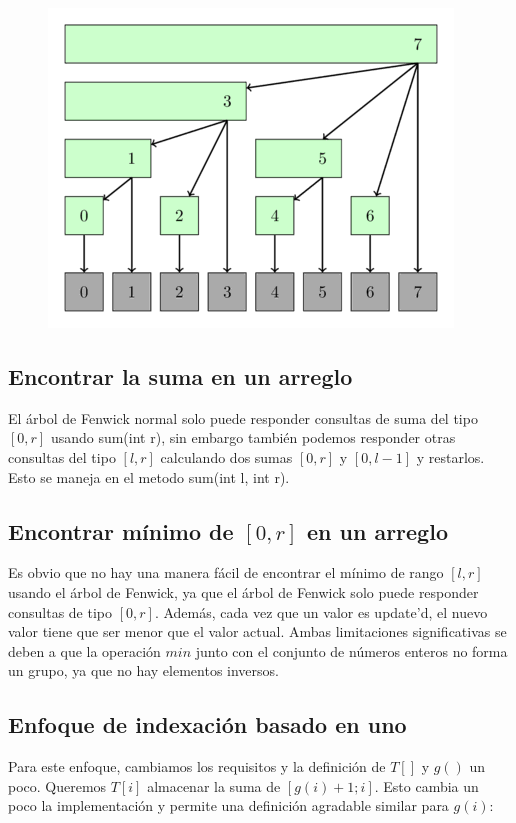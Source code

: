\begin{figure}[h!]
	\centering
	\includegraphics[width=0.5\linewidth]{img/binary_indexed_tree}
	\label{fig:binaryindexedtree}
\end{figure}

\subsection{Encontrar la suma en un arreglo}

El árbol de Fenwick normal solo puede responder consultas de suma del tipo $[0,r]$ usando sum(int 
r), sin embargo también podemos responder otras consultas del tipo $[l,r]$ calculando dos sumas 
$[0,r]$ y $[0,l-1]$ y restarlos. Esto se maneja en el metodo sum(int l, int r).

\subsection{Encontrar mínimo de $[0,r]$ en un arreglo}

Es obvio que no hay una manera fácil de encontrar el mínimo de rango $[l,r]$ usando el árbol de Fenwick, ya que el árbol de Fenwick solo puede responder consultas de tipo $[0,r]$. Además, cada vez que un valor es update'd, el nuevo valor tiene que ser menor que el valor actual. Ambas limitaciones significativas se deben a que la operación $min$ junto con el conjunto de números enteros no forma un grupo, ya que no hay elementos inversos.

\subsection{Enfoque de indexación basado en uno}

Para este enfoque, cambiamos los requisitos y la definición de $T[]$ y $g()$ un poco. Queremos $T[i]$ almacenar la suma de $[g(i)+1;i]$. Esto cambia un poco la implementación y permite una definición agradable similar para $g(i)$:

